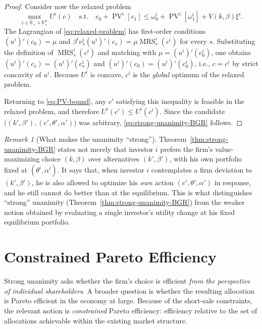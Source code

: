 \documentclass[11pt,a4paper,oneside]{book}
\def\R{\mathbb{R}}
\def\leq{\leqslant}
\DeclareMathOperator{\MRS}{MRS}
\DeclareMathOperator{\PV}{PV}
\theoremstyle{plain}
\theoremstyle{definition}
\theoremstyle{remark}
\newtheorem{remark}[theorem]{Remark}
\numberwithin{equation}{chapter}
\begin{document}
\begin{proof}
Consider now the relaxed problem
\begin{equation}\label{eq:relaxed-problem}
  \max_{c \in \R_+ \times \R_+^S} U^i(c)
  \quad \text{s.t.} \quad
  c_0 + \PV^i[c_1] \leq \omega^i_0 + \PV^i[\omega^i_1] + V(k, \beta) \xi^i.
\end{equation}
The Lagrangian of \eqref{eq:relaxed-problem} has first-order conditions $(u^i)'(c_0) = \mu$ and $\beta^i \nu^i_s (u^i)'(c_s) = \mu \MRS^i_s(c^i)$ for every $s$.
Substituting the definition of $\MRS^i_s(c^i)$ and matching with $\mu = (u^i)'(c^i_0)$, one obtains $(u^i)'(c_s) = (u^i)'(c^i_s)$ and $(u^i)'(c_0) = (u^i)'(c^i_0)$, i.e., $c = c^i$ by strict concavity of $u^i$.
Because $U^i$ is concave, $c^i$ is the \emph{global} optimum of the relaxed problem.

Returning to \eqref{eq:PV-bound}, any $c'$ satisfying this inequality is feasible in the relaxed problem, and therefore $U^i(c') \leq U^i(c^i)$.
Since the candidate $\bigl( (k', \beta'), (c', \theta', \alpha') \bigr)$ was arbitrary, \eqref{eq:strong-unanimity-BGR} follows.
\end{proof}

\begin{remark}[What makes the unanimity ``strong'']\label{rem:why-strong}
Theorem~\ref{thm:strong-unanimity-BGR} states not merely that investor $i$ prefers the firm's value-maximizing choice $(k, \beta)$ over alternatives $(k', \beta')$, with his own portfolio fixed at $(\theta^i, \alpha^i)$.
It says that, when investor $i$ contemplates a firm deviation to $(k', \beta')$, he is also allowed to optimize his \emph{own} action $(c', \theta', \alpha')$ in response, and he still cannot do better than at the equilibrium.
This is what distinguishes ``strong'' unanimity (Theorem~\ref{thm:strong-unanimity-BGR}) from the weaker notion obtained by evaluating a single investor's utility change at his fixed equilibrium portfolio.
\end{remark}

\section{Constrained Pareto Efficiency}
\label{sec:constrained-efficiency}

Strong unanimity asks whether the firm's choice is efficient \emph{from the perspective of individual shareholders}.
A broader question is whether the resulting allocation is Pareto efficient in the economy at large.
Because of the short-sale constraints, the relevant notion is \emph{constrained} Pareto efficiency: efficiency relative to the set of allocations achievable within the existing market structure.
\end{document}
